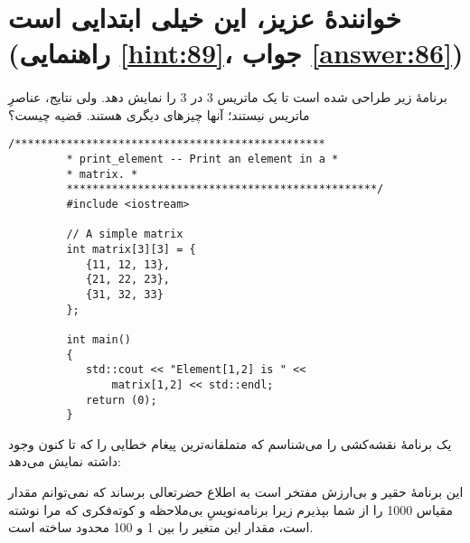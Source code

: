 \section[خوانندهٔ عزیز، این خیلی ابتدایی است]{خوانندهٔ عزیز، این خیلی ابتدایی است \protect{} (راهنمایی \ref{hint:89}، جواب \ref{answer:86})}
\paragraph{}\label{prog:29}
برنامهٔ زیر طراحی شده است تا یک ماتریس 3 در 3 را نمایش دهد. ولی نتایج، عناصرِ ماتریس نیستند؛ آنها چیزهای دیگری هستند. قضیه چیست؟

\begin{LTR}
    \begin{lstlisting}[style=C++Style]
         /************************************************
         * print_element -- Print an element in a *
         * matrix. *
         ************************************************/
         #include <iostream>

         // A simple matrix
         int matrix[3][3] = {
         	{11, 12, 13},
         	{21, 22, 23},
         	{31, 32, 33}
         };

         int main()
         {
         	std::cout << "Element[1,2] is " <<
         		matrix[1,2] << std::endl;
         	return (0);
         }
    \end{lstlisting}
\end{LTR}

\begin{tcolorbox}
    یک برنامهٔ نقشه‌کشی را می‌شناسم که متملقانه‌ترین پیغام خطایی را که تا کنون وجود داشته نمایش می‌دهد:

    این برنامهٔ حقیر و بی‌ارزش مفتخر است به اطلاع حضرتعالی برساند که نمی‌توانم مقدار مقیاس 1000 را از شما بپذیرم زیرا برنامه‌نویسِ بی‌ملاحظه و کوته‌فکری که مرا نوشته است، مقدار این متغیر را بین 1 و 100 محدود ساخته است.
\end{tcolorbox}